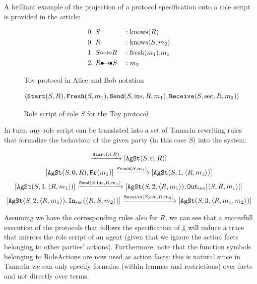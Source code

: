 \documentclass{article}
\def\ins{\hbox{$\circ$}\kern-1.5pt\hbox{$\to$}\kern -1pt\hbox{$\circ$}}
\def\sec{\hbox{$\bullet$}\kern-1.5pt\hbox{$\to$}\kern -1pt\hbox{$\bullet$}}
\newcommand{\mono}[1]{\textrm{\tt #1}}
\begin{document}
A brilliant example of the projection of a protocol specification onto a role script is provided in the article:

\begin{figure}
\begin{alignat*}{3}
    &0.\  S &&: \textrm{knows}(R)\\
    &0.\  R &&: \textrm{knows}(S, m_2)\\
    &1.\  S \ins R &&: \textrm{fresh}(m_1).m_1\\
    &2.\  R \sec S &&: m_2
\end{alignat*}
\label{eq:toy_protocol}
\caption{Toy protocol in Alice and Bob notation}
\end{figure}

\begin{figure}
\begin{equation*}
    \langle \mono{Start}(S,R), \mono{Fresh}(S, m_1), \mono{Send}(S, \textrm{ins}, R, m_1), \mono{Receive}(S, \textrm{sec}, R, m_2) \rangle
\end{equation*}
\caption{Role script of role $S$ for the Toy protocol}
\end{figure}

In turn, any role script can be translated into a set of Tamarin rewriting rules that formalize the behaviour of the given party (in this case $S$) into the system:

\begin{gather*}
    [ \ ] \xrightarrow{\mono{Start}(S,R)} [\mono{AgSt}(S,0,R)]\\
    [\mono{AgSt}(S,0,R), \mono{Fr}(m_1)] \xrightarrow{\mono{Fresh}(S,m_1)} [\mono{AgSt}(S,1,\langle R,m_1 \rangle)]\\
    [\mono{AgSt}(S,1,\langle R,m_1 \rangle)] \xrightarrow{\mono{Send}(S,\textrm{ins},R,m_1)} [\mono{AgSt}(S,2,\langle R,m_1 \rangle), \mono{Out}_\textrm{ins}(\langle S, R, m_1 \rangle)]\\
    [\mono{AgSt}(S,2,\langle R,m_1 \rangle), \mono{In}_\textrm{sec}(\langle R, S, m_2 \rangle)] \xrightarrow{\mono{Receive}(S, \textrm{sec}, R, m_2)} [\mono{AgSt}(S,3,\langle R, m_1, m_2 \rangle)]
\end{gather*}

Assuming we have the corresponding rules also for $R$, we can see that a succesfull execution of the protocols that follows the specification of \ref{eq:toy_protocol} will induce a trace that mirrors the role script of an agent (given that we ignore the action facts belonging to other parties' actions). Furthermore, note that the function symbols belonging to $\textrm{RoleActions}$ are now used as action facts: this is natural since in Tamarin we can only specify formulas (within lemmas and restrictions) over facts and not directly over terms.
\end{document}
